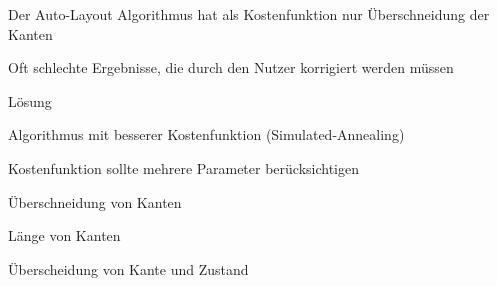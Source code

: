 {
    \begin{itemgroup}{}
	\item Der Auto-Layout Algorithmus hat als Kostenfunktion nur Überschneidung der Kanten
	\item Oft schlechte Ergebnisse, die durch den Nutzer korrigiert werden müssen
    \end{itemgroup}

    \begin{itemgroup}{Lösung}
	\item Algorithmus mit besserer Kostenfunktion (Simulated-Annealing)
	\item Kostenfunktion sollte mehrere Parameter berücksichtigen
		\begin{itemgroup}{}
		\item Überschneidung von Kanten
		\item Länge von Kanten
		\item Überscheidung von Kante und Zustand
		\end{itemgroup}
	\end{itemgroup}
    
    \vfill{}
}


